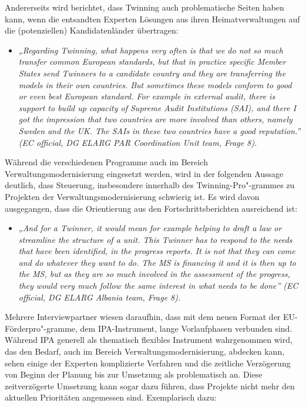 Andererseits wird berichtet, dass Twinning auch problematische Seiten haben kann, wenn die entsandten Experten Lösungen aus ihren Heimatverwaltungen auf die (potenziellen) Kandidatenländer übertragen:
\begin{itemize}[label={}]
\item \textit{„Regarding Twinning, what happens very often is that we do not so much transfer common European standards, but that in practice specific Member States send Twinners to a candidate country and they are transferring the models in their own countries. But sometimes these models conform to good or even best European standard. For example in external audit, there is support to build up capacity of Supreme Audit Institutions (SAI), and there I got the impression that two countries are more involved than others, namely Sweden and the UK. The SAIs in these two countries have a good reputation.” (EC official, DG ELARG PAR Coordination Unit team, Frage 8).}
\end{itemize}
Während die verschiedenen Programme auch im Bereich Verwaltungsmodernisierung eingesetzt werden, wird in der folgenden Aussage deutlich, dass Steuerung, insbesondere innerhalb des Twinning-Pro"-grammes zu Projekten der Verwaltungsmodernisierung schwierig ist. Es wird davon ausgegangen, dass die Orientierung aus den Fortschrittsberichten ausreichend ist:
\begin{itemize}[label={}]
\item \textit{„And for a Twinner, it would mean for example helping to draft a law or streamline the structure of a unit. This Twinner has to respond to the needs that have been identified, in the progress reports. It is not that they can come and do whatever they want to do. The MS is financing it and it is then up to the MS, but as they are so much involved in the assessment of the progress, they would very much follow the same interest in what needs to be done” (EC official, DG ELARG Albania team, Frage 8).}
\end{itemize}
Mehrere Interviewpartner wiesen daraufhin, dass mit dem neuen Format der EU-Förderpro"-gramme, dem IPA-Instrument, lange Vorlaufphasen verbunden sind. Während IPA generell als thematisch flexibles Instrument wahrgenommen wird, das den Bedarf, auch im Bereich Verwaltungsmodernisierung, abdecken kann, sehen einige der Experten komplizierte Verfahren und die zeitliche Verzögerung von Beginn der Planung bis zur Umsetzung als problematisch an. Diese zeitverzögerte Umsetzung kann sogar dazu führen, dass Projekte nicht mehr den aktuellen Prioritäten angemessen sind. Exemplarisch dazu:
